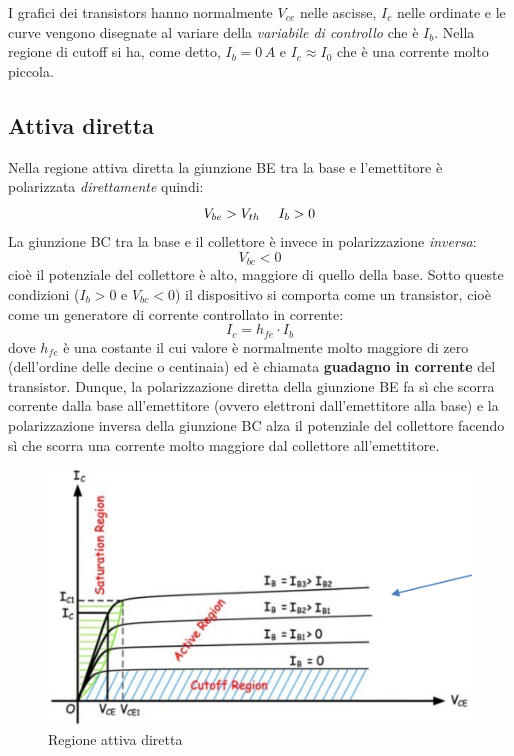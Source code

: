 \documentclass[12pt, a4paper]{report}
\begin{document}
I grafici dei transistors hanno normalmente $V_{ce}$ nelle ascisse, $I_{c}$ nelle ordinate e le curve vengono disegnate al variare della \textit{variabile di controllo} che è $I_{b}$. Nella regione di cutoff si ha, come detto, $I_{b} = 0\,A$ e $I_{c} \approx I_{0}$ che è una corrente molto piccola.
\subsection{Attiva diretta}
Nella regione attiva diretta la giunzione BE tra la base e l'emettitore è polarizzata \textit{direttamente} quindi:
\begin{equation*}
    V_{be} > V_{th} \text{ \, \, } I_{b} > 0
\end{equation*}
La giunzione BC tra la base e il collettore è invece in polarizzazione \textit{inversa}:
\begin{equation*}
    V_{bc} < 0
\end{equation*}
cioè il potenziale del collettore è alto, maggiore di quello della base. Sotto queste condizioni ($I_{b} > 0 $ e $V_{bc} < 0$) il dispositivo si comporta come un transistor, cioè come un generatore di corrente controllato in corrente:
\begin{equation}
    I_{c} = h_{fe} \cdot I_{b}
    \label{corrente_attiva_diretta}
\end{equation}
dove $h_{fe}$ è una costante il cui valore è normalmente molto maggiore di zero (dell'ordine delle decine o centinaia) ed è chiamata \textbf{guadagno in corrente} del transistor. Dunque, la polarizzazione diretta della giunzione BE fa sì che scorra corrente dalla base all'emettitore (ovvero elettroni dall'emettitore alla base) e la polarizzazione inversa della giunzione BC alza il potenziale del collettore facendo sì che scorra una corrente molto maggiore dal collettore all'emettitore.
\begin{figure}[h]
    \centering
    \includegraphics[scale=0.4,angle=0]{bjt_attiva_diretta.png}
    \caption{Regione attiva diretta}
    \label{attiva_diretta}
\end{figure}
\end{document}
